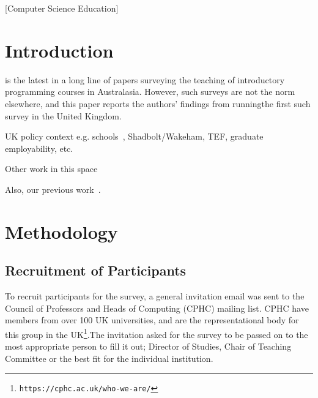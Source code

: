 \documentclass{sig-alternate}
\begin{document}
[Computer Science Education]

\section{Introduction}\label{intro}

\cite{mason+cooper:2014} is the latest in a long line \cite{deraadt-et-al:2004,mason-et-al:2012} of papers surveying the teaching of introductory programming courses in Australasia. However, such surveys are not the norm elsewhere, and this paper reports the authors' findings from runningthe first such survey in the United Kingdom.

UK policy context
e.g. schools~\cite{brown-et-al-sigcse2013,brown-et-al-toce2014},
Shadbolt/Wakeham, TEF, graduate employability, etc.

Other work in this
space~\cite{mccracken-et-al:2001,gupta:2004,dale:2006,pears-et-al:2007,guo:2014}

Also, our previous work~\cite{crick-et-al-hea:2015,davenport-et-al:latice2016}.


\section{Methodology}\label{method}

\subsection{Recruitment of Participants}

To recruit participants for the survey, a general invitation email was sent to the Council of Professors and Heads of Computing (CPHC) mailing list. CPHC have members from over 100 UK universities, and are the representational body for this group in the UK\footnote{\texttt{https://cphc.ac.uk/who-we-are/}}.The invitation asked for the survey to be passed on to the most appropriate person to fill it out; Director of Studies, Chair of Teaching Committee or the best fit for the individual institution.
\end{document}

